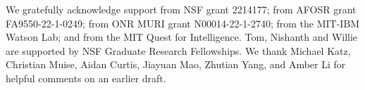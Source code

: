 We gratefully acknowledge support from NSF grant 2214177; from AFOSR grant FA9550-22-1-0249; from ONR MURI grant N00014-22-1-2740; from the MIT-IBM Watson Lab; and from the MIT Quest for Intelligence.
Tom, Nishanth and Willie are supported by NSF Graduate Research Fellowships.
We thank Michael Katz, Christian Muise, Aidan Curtis, Jiayuan Mao, Zhutian Yang, and Amber Li for helpful comments on an earlier draft.
